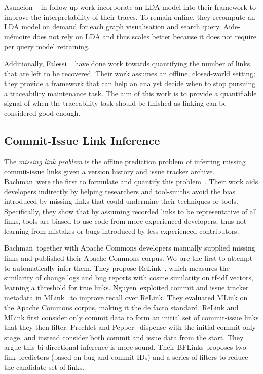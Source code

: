 Asuncion \etal~\cite{TopicTraceability} in follow-up work incorporate an LDA
model into their framework to improve the interpretability of their traces. To
remain online, they recompute an LDA model on demand for each graph
visualisation and search query. Aide-mémoire does not rely on LDA and thus
scales better because it does not require per query model retraining.

Additionally, Falessi \etal~\cite{Falessi2017} have done work towards
quantifying the number of links that are left to be recovered. Their work
assumes an offline, closed-world setting; they provide a framework that can help
an analyst decide when to stop pursuing a traceability maintenance task. The aim
of this work is to provide a quantifiable signal of when the traceability task
should be finished as linking can be considered good enough.

\subsection{Commit-Issue Link Inference}
\label{chapter:literature:sec:am_rel_work:cli}

The \emph{missing link problem} is the offline prediction problem of inferring
missing commit-issue links given a version history and issue tracker archive.
Bachman~\etal were the first to formulate and quantify this
problem~\cite{Bird2009,MissingLinks}. Their work aids developers indirectly by
helping researchers and tool-smiths avoid the bias introduced by missing links
that could undermine their techniques or tools. Specifically, they show that by
assuming recorded links to be representative of all links, tools are biased to
use code from more experienced developers, thus not learning from mistakes or
bugs introduced by less experienced contributors. 

Bachman~\etal together with Apache Commons developers manually supplied missing
links and published their Apache Commons corpus. Wo~\etal are the first to
attempt to automatically infer them. They propose ReLink~\cite{relink}, which
measures the similarity of change logs and bug reports with cosine similarity on
tf-idf vectors, learning a threshold for true links. Nguyen~\etal exploited
commit and issue tracker metadata in MLink~\cite{MLink} to improve recall over
ReLink. They evaluated MLink on the Apache Commons corpus, making it the de
facto standard. ReLink and MLink first consider only commit data to form an
initial set of commit-issue links that they then filter. Prechlet and
Pepper~\cite{prechelt2014bflinks} dispense with the initial commit-only stage,
and instead consider both commit and issue data from the start. They argue this
bi-directional inference is more sound. Their BFLinks proposes two link
predictors (based on bug and commit IDs) and a series of filters to reduce the
candidate set of links.

